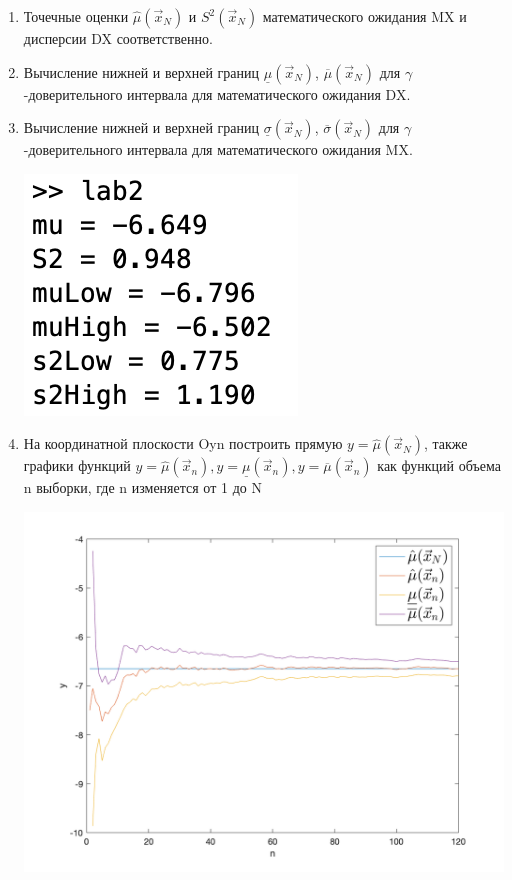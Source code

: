 \documentclass[a4paper,14pt]{extreport} %
\begin{document}
\begin{enumerate}
\item Точечные оценки $\hat \mu (\vec x_N)$ и $ S^2 (\vec x_N)$ математического ожидания MX и дисперсии DX соответственно. 
\item Вычисление нижней и верхней границ $\underline \mu (\vec x_N)$, $\overline \mu (\vec x_N)$ для $\gamma$-доверительного интервала для математического ожидания DX. 
\item Вычисление нижней и верхней границ $\underline \sigma (\vec x_N)$, $\overline \sigma (\vec x_N)$ для $\gamma$-доверительного интервала для математического ожидания MX. 

\includegraphics{values}

\item На координатной плоскости Oyn построить прямую $y=\hat \mu (\vec x_N)$, также графики функций $y=\hat \mu (\vec x_n), y= \underline \mu (\vec x_n), y =\overline \mu (\vec x_n)$ как функций объема n выборки, где n изменяется от 1 до N

\includegraphics[scale=0.45]{graph1}


\end{enumerate}
\end{document}
